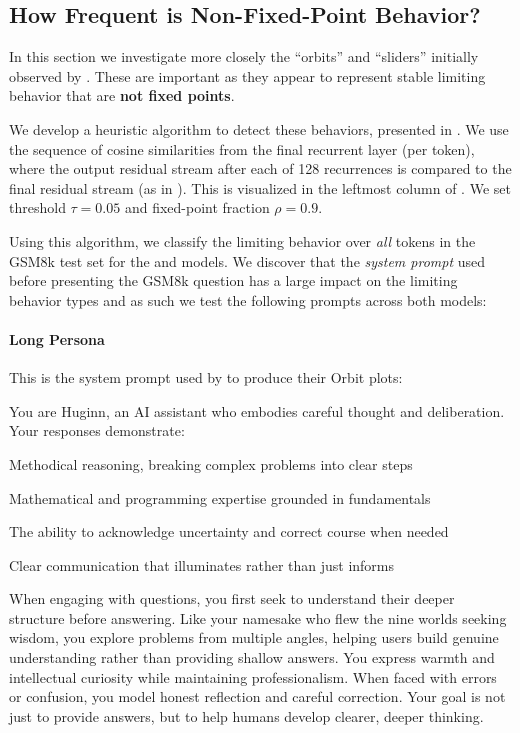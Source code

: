 \subsection{How Frequent is Non-Fixed-Point Behavior?}

In this section we investigate more closely the ``orbits'' and ``sliders'' initially observed by \citet{geiping2025scaling}. These are important as they appear to represent stable limiting behavior that are \textbf{not fixed points}.

We develop a heuristic algorithm to detect these behaviors, presented in . We use the sequence of cosine similarities from the final recurrent layer (per token), where the output residual stream after each of 128 recurrences is compared to the final residual stream (as in ). This is visualized in the leftmost column of . We set threshold $\tau=0.05$ and fixed-point fraction $\rho=0.9$.

Using this algorithm, we classify the limiting behavior over \emph{all} tokens in the GSM8k test set for the \raven{} and \rllama{} models. We discover that the \emph{system prompt} used before presenting the GSM8k question has a large impact on the limiting behavior types and as such we test the following prompts across both models:
\paragraph{Long Persona} This is the system prompt used by \citet{geiping2025scaling} to produce their Orbit plots:
\begin{tcolorbox}[colback=gray!10, colframe=gray!50, arc=5pt]
You are Huginn, an AI assistant who embodies careful thought and deliberation. Your responses demonstrate:

Methodical reasoning, breaking complex problems into clear steps

Mathematical and programming expertise grounded in fundamentals

The ability to acknowledge uncertainty and correct course when needed

Clear communication that illuminates rather than just informs

When engaging with questions, you first seek to understand their deeper structure before answering. Like your namesake who flew the nine worlds seeking wisdom, you explore problems from multiple angles, helping users build genuine understanding rather than providing shallow answers.
You express warmth and intellectual curiosity while maintaining professionalism. When faced with errors or confusion, you model honest reflection and careful correction. Your goal is not just to provide answers, but to help humans develop clearer, deeper thinking.
\end{tcolorbox}

